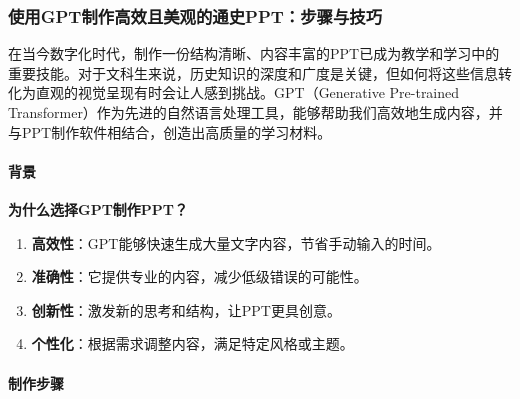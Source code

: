 \hypertarget{ux4f7fux7528gptux5236ux4f5cux9ad8ux6548ux4e14ux7f8eux89c2ux7684ux901aux53f2pptux6b65ux9aa4ux4e0eux6280ux5de7}{%
  \subsubsection{使用GPT制作高效且美观的通史PPT：步骤与技巧}\label{ux4f7fux7528gptux5236ux4f5cux9ad8ux6548ux4e14ux7f8eux89c2ux7684ux901aux53f2pptux6b65ux9aa4ux4e0eux6280ux5de7}}

在当今数字化时代，制作一份结构清晰、内容丰富的PPT已成为教学和学习中的重要技能。对于文科生来说，历史知识的深度和广度是关键，但如何将这些信息转化为直观的视觉呈现有时会让人感到挑战。GPT（Generative
Pre-trained
Transformer）作为先进的自然语言处理工具，能够帮助我们高效地生成内容，并与PPT制作软件相结合，创造出高质量的学习材料。

\hypertarget{ux80ccux666f}{%
  \paragraph{背景}\label{ux80ccux666f}}

\textbf{为什么选择GPT制作PPT？}

\begin{enumerate}
  \def\labelenumi{\arabic{enumi}.}

  \item
        \textbf{高效性}：GPT能够快速生成大量文字内容，节省手动输入的时间。
  \item
        \textbf{准确性}：它提供专业的内容，减少低级错误的可能性。
  \item
        \textbf{创新性}：激发新的思考和结构，让PPT更具创意。
  \item
        \textbf{个性化}：根据需求调整内容，满足特定风格或主题。
\end{enumerate}

\hypertarget{ux5236ux4f5cux6b65ux9aa4}{%
  \paragraph{制作步骤}\label{ux5236ux4f5cux6b65ux9aa4}}

